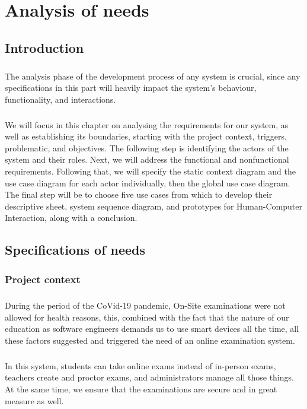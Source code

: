 \documentclass[]{uc2pfecaneva}
\begin{document}
    \setlength{\parskip}{6pt}
    \tableofcontents
    \listoffigures
    \listoftables
    \chapter{Analysis of needs}

    \newpage

    \raggedright\section{Introduction}
    \justifying\paragraph{}
    The analysis phase of the development process of any system is crucial, since any specifications in this part will heavily impact the system's behaviour, functionality, and interactions.
    \justifying\paragraph{}
    We will focus in this chapter on analysing the requirements for our system, as well as establishing its boundaries, starting with the project context, triggers, problematic, and objectives. The following step is identifying the actors of the system and their roles. Next, we will address the functional and nonfunctional requirements. Following that, we will specify the static context diagram and the use case diagram for each actor individually, then the global use case diagram. The final step will be to choose five use cases from which to develop their descriptive sheet, system sequence diagram, and prototypes for Human-Computer Interaction, along with a conclusion.

    \raggedright\section{Specifications of needs}
    \subsection{Project context}
    \justifying\paragraph{}
    During the period of the CoVid-19 pandemic, On-Site examinations were not allowed for health reasons, this, combined with the fact that the nature of our education as software engineers demands us to use smart devices all the time, all these factors suggested and triggered the need of an online examination system.
    \justifying\paragraph{}
    In this system, students can take online exams instead of in-person exams, teachers create and proctor exams, and administrators manage all those things. At the same time, we ensure that the examinations are secure and in great measure as well.
\end{document}

